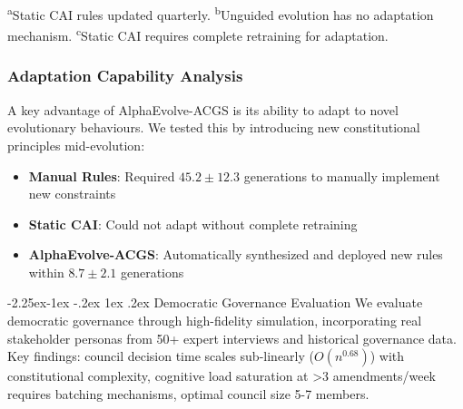 \documentclass[manuscript,screen,review,anonymous,9pt]{acmart}
\makeatletter
\renewcommand\subsection{\@startsection{subsection}{2}{\z@}%
  {-2.25ex\@plus -1ex \@minus -.2ex}%
  {1ex \@plus .2ex}%
  {\normalfont\large\bfseries}}
\makeatother
\begin{document}
\begin{table}[htbp]
	\begin{minipage}{\linewidth}\footnotesize \textsuperscript{a}Static CAI rules updated quarterly. \textsuperscript{b}Unguided evolution has no adaptation mechanism. \textsuperscript{c}Static CAI requires complete retraining for adaptation.\end{minipage}
\end{table}

\subsubsection{Adaptation Capability Analysis}
A key advantage of AlphaEvolve-ACGS is its ability to adapt to novel evolutionary behaviours. We tested this by introducing new constitutional principles mid-evolution:

\begin{itemize}
	\item \textbf{Manual Rules}: Required $45.2 \pm 12.3$ generations to manually implement new constraints
	\item \textbf{Static CAI}: Could not adapt without complete retraining
	\item \textbf{AlphaEvolve-ACGS}: Automatically synthesized and deployed new rules within $8.7 \pm 2.1$ generations
\end{itemize}

\subsection{Democratic Governance Evaluation}
\label{sec:governance_evaluation}
We evaluate democratic governance through high-fidelity simulation, incorporating real stakeholder personas from 50+ expert interviews and historical governance data. Key findings: council decision time scales sub-linearly ($O(n^{0.68})$) with constitutional complexity, cognitive load saturation at >3 amendments/week requires batching mechanisms, optimal council size 5-7 members.
\end{document}
